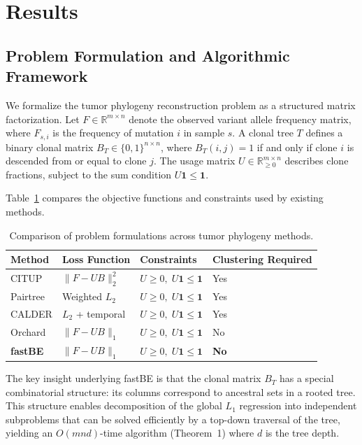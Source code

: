 \documentclass[11pt]{article}
\begin{document}
\section{Results}

\subsection{Problem Formulation and Algorithmic Framework}

We formalize the tumor phylogeny reconstruction problem as a structured matrix factorization. Let $F \in \mathbb{R}^{m \times n}$ denote the observed variant allele frequency matrix, where $F_{s,i}$ is the frequency of mutation $i$ in sample $s$. A clonal tree $T$ defines a binary clonal matrix $B_T \in \{0,1\}^{n \times n}$, where $B_T(i,j) = 1$ if and only if clone $i$ is descended from or equal to clone $j$. The usage matrix $U \in \mathbb{R}^{m \times n}_{\geq 0}$ describes clone fractions, subject to the sum condition $U \mathbf{1} \leq \mathbf{1}$.

Table~\ref{tab:formulations} compares the objective functions and constraints used by existing methods.

\begin{table}[H]
\centering
\caption{Comparison of problem formulations across tumor phylogeny methods.}
\label{tab:formulations}
\begin{tabular}{llll}
\toprule
\textbf{Method} & \textbf{Loss Function} & \textbf{Constraints} & \textbf{Clustering Required} \\
\midrule
CITUP & $\|F - UB\|_2^2$ & $U \geq 0,\; U\mathbf{1} \leq \mathbf{1}$ & Yes \\
Pairtree & Weighted $L_2$ & $U \geq 0,\; U\mathbf{1} \leq \mathbf{1}$ & Yes \\
CALDER & $L_2$ + temporal & $U \geq 0,\; U\mathbf{1} \leq \mathbf{1}$ & Yes \\
Orchard & $\|F - UB\|_1$ & $U \geq 0,\; U\mathbf{1} \leq \mathbf{1}$ & No \\
\textbf{fastBE} & $\|F - UB\|_1$ & $U \geq 0,\; U\mathbf{1} \leq \mathbf{1}$ & \textbf{No} \\
\bottomrule
\end{tabular}
\end{table}

The key insight underlying fastBE is that the clonal matrix $B_T$ has a special combinatorial structure: its columns correspond to ancestral sets in a rooted tree. This structure enables decomposition of the global $L_1$ regression into independent subproblems that can be solved efficiently by a top-down traversal of the tree, yielding an $O(mnd)$-time algorithm (Theorem~1) where $d$ is the tree depth.
\end{document}
